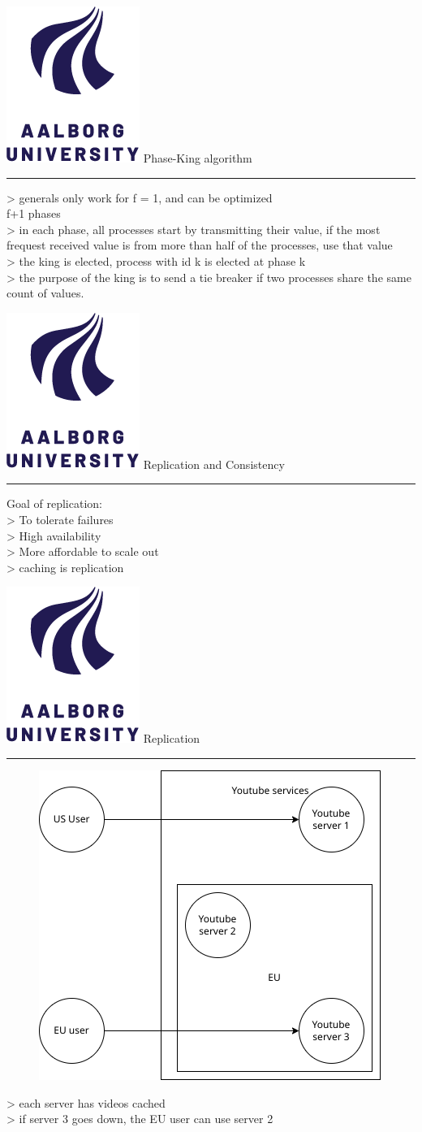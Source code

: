 \documentclass[aspectratio=1610,17pt,utf8]{beamer}
\newcommand{\mainframe}[1]{\color{blue} \includegraphics[width=.05\textwidth]{figures/aau.png} #1\\\hrule}
\newcommand{\regularframe}[1]{\color{black}\includegraphics[width=.05\textwidth]{figures/aau.png} #1\\\hrule}
\begin{document}
\begin{frame}{\regularframe{Phase-King algorithm}}
    > generals only work for f = 1, and can be optimized\\
    f+1 phases\\
    > in each phase, all processes start by transmitting their value, if the most frequest received value is from more than half of the processes, use that value\\
    > the king is elected, process with id k is elected at phase k\\
    > the purpose of the king is to send a tie breaker if two processes share the same count of values.
\end{frame}


\begin{frame}{\mainframe{Replication and Consistency}}
    Goal of replication:\\
    > To tolerate failures\\
    > High availability\\
    > More affordable to scale out\\
    > caching is replication
\end{frame}

\begin{frame}{\regularframe{Replication}}
    \begin{minipage}{.45\textwidth}
        \begin{figure}
            \includegraphics[width=\textwidth]{figures/4-replication.drawio.png}
        \end{figure}
    \end{minipage}
    \begin{minipage}{.5\textwidth}
        > each server has videos cached\\
        > if server 3 goes down, the EU user can use server 2
    \end{minipage}
\end{frame}
\end{document}
